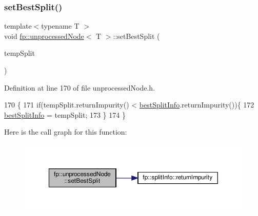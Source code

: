 \subsubsection{\texorpdfstring{set\+Best\+Split()}{setBestSplit()}\hspace{0.1cm}{\footnotesize\ttfamily [2/2]}}
{\footnotesize\ttfamily template$<$typename T $>$ \\
void \hyperlink{classfp_1_1unprocessedNode}{fp\+::unprocessed\+Node}$<$ T $>$\+::set\+Best\+Split (\begin{DoxyParamCaption}\item[{\hyperlink{classfp_1_1splitInfo}{split\+Info}$<$ T $>$}]{temp\+Split }\end{DoxyParamCaption})\hspace{0.3cm}{\ttfamily [inline]}}



Definition at line 170 of file unprocessed\+Node.\+h.


\begin{DoxyCode}
170                                                                 \{
171                     \textcolor{keywordflow}{if}(tempSplit.returnImpurity() < \hyperlink{classfp_1_1unprocessedNode_ae60e5f84c9a80537cb84dfd17e70e893}{bestSplitInfo}.returnImpurity())\{
172                         \hyperlink{classfp_1_1unprocessedNode_ae60e5f84c9a80537cb84dfd17e70e893}{bestSplitInfo} = tempSplit;
173                     \}
174                 \}
\end{DoxyCode}
Here is the call graph for this function\+:
\nopagebreak
\begin{figure}[H]
\begin{center}
\leavevmode
\includegraphics[width=350pt]{classfp_1_1unprocessedNode_ae7ad0b6bf8142ea5d3d851e29b5b9aee_cgraph}
\end{center}
\end{figure}
\mbox{\label{classfp_1_1unprocessedNode_ae1aa4f8f868fe19c8e48d3fe1e5596a8}} 
